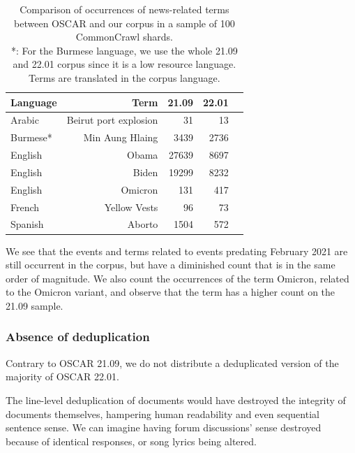\begin{table}[t]
    \centering\small
    \begin{tabular}{lrrrr}
        \toprule
        Language                  & Term                  & 21.09 & 22.01 \\
        \midrule
        \multirow{1}{*}{Arabic}   & Beirut port explosion & 31    & 13    \\
        \multirow{1}{*}{Burmese*} & Min Aung Hlaing       & 3439  & 2736  \\
        \multirow{1}{*}{English}  & Obama                 & 27639 & 8697  \\
        \multirow{1}{*}{English}  & Biden                 & 19299 & 8232  \\
        \multirow{1}{*}{English}  & Omicron               & 131   & 417   \\
        \multirow{1}{*}{French}   & Yellow Vests          & 96    & 73    \\
        \multirow{1}{*}{Spanish}  & Aborto                & 1504  & 572   \\
        \bottomrule
    \end{tabular}
    \caption{Comparison of occurrences of news-related terms between OSCAR and our corpus in a sample of 100 CommonCrawl shards. \\ *: For the Burmese language, we use the whole 21.09 and 22.01 corpus since it is a low resource language. Terms are translated in the corpus language.}
    \label{tab:word_frequency_towards}
\end{table}

We see that the events and terms related to events predating February 2021 are still occurrent in the corpus, but have a diminished count that is in the same order of magnitude.
We also count the occurrences of the term Omicron, related to the Omicron variant, and observe that the term has a higher count on the 21.09 sample.

\subsubsection{Absence of deduplication}

Contrary to OSCAR 21.09, we do not distribute a deduplicated version of the majority of OSCAR 22.01.

The line-level deduplication of documents would have destroyed the integrity of documents themselves, hampering human readability and even sequential sentence sense. We can imagine having forum discussions' sense destroyed because of identical responses, or song lyrics being altered.

